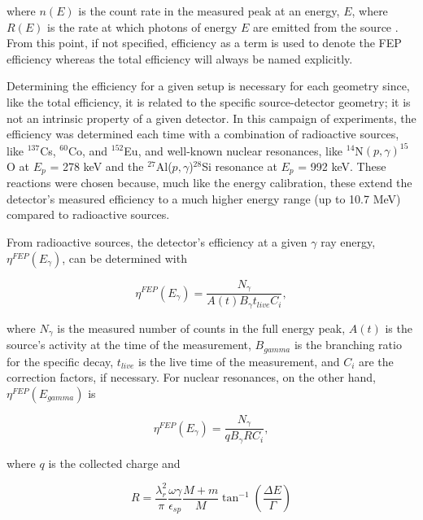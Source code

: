 \noindent where $n(E)$ is the count rate in the measured peak at an energy, $E$, where $R(E)$ is the rate at which photons of energy $E$ are emitted from the source \cite{DebertinHelmerBook}. From this point, if not specified, efficiency as a term is used to denote the FEP efficiency whereas the total efficiency will always be named explicitly. 

Determining the efficiency for a given setup is necessary for each geometry since, like the total efficiency, it is related to the specific source-detector geometry; it is not an intrinsic property of a given detector. In this campaign of experiments, the efficiency was determined each time with a combination of radioactive sources, like $^{137}$Cs, $^{60}$Co, and $^{152}$Eu, and well-known nuclear resonances, like $^{14}$N$\left( p,\gamma \right) ^{15}$O at $E_{p}$ = 278 keV and the $^{27}$Al($p, \gamma$)$^{28}$Si resonance at $E_{p}$ = 992 keV. These reactions were chosen because, much like the energy calibration, these extend the detector's measured efficiency to a much higher energy range (up to 10.7 MeV) compared to radioactive sources. 

From radioactive sources, the detector's efficiency at a given $\gamma$ ray energy, $\eta^{FEP}(E_{\gamma})$, can be determined with

\begin{equation}
\eta^{FEP} (E_{\gamma}) = \dfrac{N_{\gamma}}{A(t) B_{\gamma} t_{live} C_{i}},
\end{equation}

\noindent where $N_{\gamma}$ is the measured number of counts in the full energy peak, $A(t)$ is the source's activity at the time of the measurement, $B_{gamma}$ is the branching ratio for the specific decay, $t_{live}$ is the live time of the measurement, and $C_{i}$ are the correction factors, if necessary. For nuclear resonances, on the other hand, $\eta^{FEP} (E_{gamma})$ is 

\begin{equation}
\eta^{FEP} (E_{\gamma}) = \dfrac{N_{\gamma}}{q B_{\gamma} R C_{i}},
\end{equation}

\noindent where $q$ is the collected charge and

\begin{equation}
R = \dfrac{\lambda_{r}^{2}}{\pi} \dfrac{\omega \gamma}{\epsilon_{sp}} \dfrac{M + m}{M} \tan^{-1} \left( \dfrac{\Delta E}{\Gamma}  \right)
\label{eqn: resonanceFactor}
\end{equation}

